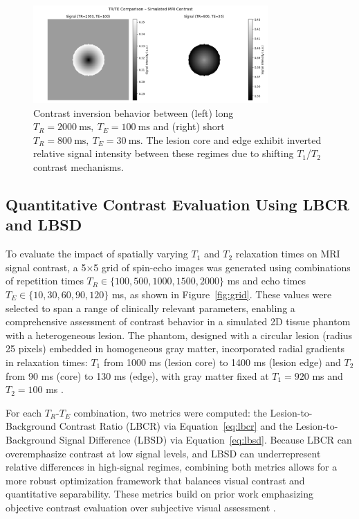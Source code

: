 \documentclass[10pt,a4paper,twoside]{article}
\begin{document}
\begin{figure}[htbp!]
\centering
\includegraphics[width=0.8\textwidth]{figures/trtecomparisonforcontrast.png}
\caption{Contrast inversion behavior between (left) long \( T_R = 2000 \ \mathrm{ms},\ T_E = 100 \ \mathrm{ms} \) and (right) short \( T_R = 800 \ \mathrm{ms},\ T_E = 30 \ \mathrm{ms} \). The lesion core and edge exhibit inverted relative signal intensity between these regimes due to shifting $T_1$/$T_2$ contrast mechanisms.}
\label{fig:inversion}
\end{figure}

\subsection{Quantitative Contrast Evaluation Using LBCR and LBSD}

To evaluate the impact of spatially varying \( T_1 \) and \( T_2 \) relaxation times on MRI signal contrast, a 5×5 grid of spin-echo images was generated using combinations of repetition times \( T_R \in \{100, 500, 1000, 1500, 2000\} \) ms and echo times \( T_E \in \{10, 30, 60, 90, 120\} \) ms, as shown in Figure~\ref{fig:grid}. These values were selected to span a range of clinically relevant parameters, enabling a comprehensive assessment of contrast behavior in a simulated 2D tissue phantom with a heterogeneous lesion. The phantom, designed with a circular lesion (radius 25 pixels) embedded in homogeneous gray matter, incorporated radial gradients in relaxation times: \( T_1 \) from 1000 ms (lesion core) to 1400 ms (lesion edge) and \( T_2 \) from 90 ms (core) to 130 ms (edge), with gray matter fixed at \( T_1 = 920 \) ms and \( T_2 = 100 \) ms \cite{stanisz2005, bojorquez2017}.

For each \( T_R \)-\( T_E \) combination, two metrics were computed: the Lesion-to-Background Contrast Ratio (LBCR) via Equation~\eqref{eq:lbcr} and the Lesion-to-Background Signal Difference (LBSD) via Equation~\eqref{eq:lbsd}. Because LBCR can overemphasize contrast at low signal levels, and LBSD can underrepresent relative differences in high-signal regimes, combining both metrics allows for a more robust optimization framework that balances visual contrast and quantitative separability. These metrics build on prior work emphasizing objective contrast evaluation over subjective visual assessment \cite{dewilde1997, mustafa2021}.
\end{document}
